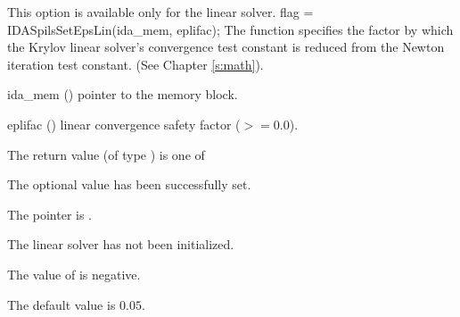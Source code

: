 {{  {\warn}This option is available only for the {\idaspgmr} linear solver.
}
{
  flag = IDASpilsSetEpsLin(ida\_mem, eplifac);
}
{
  The function  specifies the factor by
  which the Krylov linear solver's convergence test constant is reduced
  from the Newton iteration test constant. (See Chapter \ref{s:math}).
}
{
  \begin{args}
  \item[ida\_mem] ()
    pointer to the {\ida} memory block.
  \item[eplifac] ()
    linear convergence safety factor ($>= 0.0$).
  \end{args}
}
{
  The return value  (of type ) is one of
  \begin{args}
  \item[\Id{IDASPILS\_SUCCESS}] 
    The optional value has been successfully set.
  \item[\Id{IDASPILS\_MEM\_NULL}]
    The  pointer is .
  \item[\Id{IDASPILS\_LMEM\_NULL}]
    The {\idaspils} linear solver has not been initialized.
  \item[\Id{IDASPILS\_ILL\_INPUT}]
    The value of  is negative.
  \end{args}
}
{
  The default value is $0.05$.

}}
